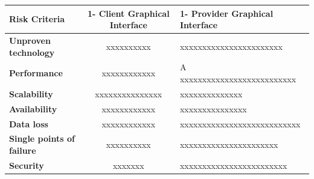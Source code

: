 \begin{table}[H]
    \begin{tabularx}{\textwidth}{lcX}
        \toprule
        \textbf{Risk Criteria}} & 1- Client Graphical Interface & 1- Provider Graphical Interface   \\
        \midrule
        \textbf{Unproven technology}& xxxxxxxxxx & xxxxxxxxxxxxxxxxxxxxxxx \\
        \textbf{Performance} & xxxxxxxxxxxx & A xxxxxxxxxxxxxxxxxxxxxxxxxx  \\
        \textbf{Scalability} & xxxxxxxxxxxxxxx & xxxxxxxxxxxxxx  \\
        \textbf{Availability} & xxxxxxxxxxxx & xxxxxxxxxxxxxxx \\
        \textbf{Data loss} & xxxxxxxxxxxx & xxxxxxxxxxxxxxxxxxxxxxxxxxx  \\
        \textbf{Single points of failure} & xxxxxxxxxx & xxxxxxxxxxxxxxxxxxxxxx \\
        \textbf{Security} & xxxxxxx & xxxxxxxxxxxxxxxxxxxxxxxx \\
        \bottomrule
    \end{tabularx}
\end{table}

